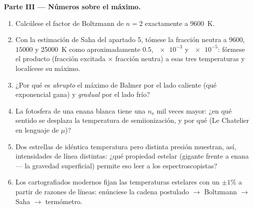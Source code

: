 \begin{problem}
\medskip\noindent\textbf{Parte III --- Números sobre el máximo.}
\begin{enumerate}[resume]
  \item Calcúlese el factor de Boltzmann de $n = 2$ exactamente a
        \qty{9600}{K}.
  \item Con la estimación de Saha del apartado 5, tómese la fracción
        neutra a $9600$, $15000$ y \qty{25000}{K} como
        aproximadamente $0.5$, $\num{e-3}$ y $\num{e-5}$: fórmese el producto
        (fracción excitada $\times$ fracción neutra) a esas tres
        temperaturas y localícese su máximo.
  \item ¿Por qué es \emph{abrupto} el máximo de Balmer por el lado
        caliente (qué exponencial gana) y \emph{gradual} por el lado
        frío?
  \item La fotosfera de una enana blanca tiene una $n_{\text{e}}$ mil
        veces mayor: ¿en qué sentido se desplaza la temperatura de
        semiionización, y por qué (Le Chatelier en lenguaje de
        $\mu$)?
  \item Dos estrellas de idéntica temperatura pero distinta presión
        muestran, así, intensidades de línea distintas: ¿qué propiedad
        estelar (gigante frente a enana --- la gravedad superficial)
        permite eso leer a los espectroscopistas?
  \item Los cartografiados modernos fijan las temperaturas estelares con
        un $\pm1\%$ a partir de razones de líneas: enúnciese la cadena
        postulado $\to$ Boltzmann $\to$ Saha $\to$ termómetro.
\end{enumerate}


\end{problem}
